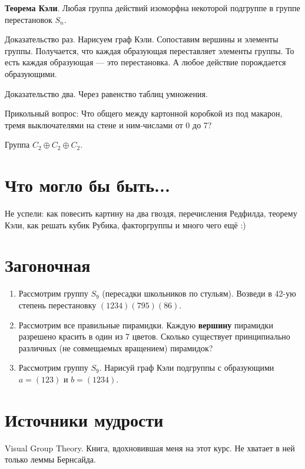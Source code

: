 \documentclass[12pt]{article} %
\begin{document}
\textbf{Теорема Кэли}. Любая группа действий изоморфна некоторой подгруппе в группе перестановок $S_n$.

Доказательство раз. Нарисуем граф Кэли. Сопоставим вершины и элементы группы. Получается, что каждая образующая переставляет элементы группы. То есть каждая образующая — это перестановка. А любое действие порождается образующими.


Доказательство два. Через равенство таблиц умножения.



Прикольный вопрос: Что общего между картонной коробкой из под макарон, тремя выключателями на стене и ним-числами от 0 до 7?

Группа $C_2 \oplus C_2 \oplus C_2$.


\section{Что могло бы быть...}

Не успели: как повесить картину на два гвоздя, перечисления Редфилда, теорему Кэли, как решать кубик Рубика, факторгруппы и много чего ещё :)


\section{Загоночная}

\begin{enumerate}
\item Рассмотрим группу $S_{9}$ (пересадки школьников по стульям). Возведи в 42-ую степень перестановку $(1234)(795)(86)$.

\item Рассмотрим все правильные пирамидки. Каждую \textbf{вершину} пирамидки разрешено красить в один из 7 цветов. Сколько существует принципиально различных (не совмещаемых вращением) пирамидок?

\item Рассмотрим группу $S_9$. Нарисуй граф Кэли подгруппы с образующими $a=(123)$ и $b=(1234)$.

\end{enumerate}



\section{Источники мудрости}

Visual Group Theory. Книга, вдохновившая меня на этот курс. Не хватает в ней только леммы Бернсайда.
\end{document}
